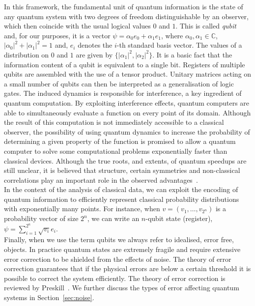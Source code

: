 \documentclass[a4paper, 11pt]{article}
\begin{document}
In this framework, the fundamental unit of quantum information is the state of any quantum system with two degrees of freedom distinguishable by an observer, which then coincide with the usual logical values $0$ and $1$. This is called \emph{qubit} and, for our purposes, it is a vector $\psi = \alpha_0 e_0 + \alpha_1 e_1$, where $\alpha_0, \alpha_1 \in \mathbb{C}$, $|\alpha_0|^2 + |\alpha_1|^2 = 1$ and, $e_i$ denotes the $i$-th standard basis vector. The values of a distribution on $0$ and $1$ are given by $\{|\alpha_1|^2,|\alpha_2|^2\}$. It is a basic fact that the information content of a qubit is equivalent to a single bit. Registers of multiple qubits are assembled with the use of a tensor product. Unitary matrices acting on a small number of qubits can then be interpreted as a generalisation of logic gates. The induced dynamics is responsible for interference, a key ingredient of quantum computation. By exploiting interference effects, quantum computers are able to simultaneously evaluate a function on every point of its domain. Although the result of this computation is not immediately accessible to a classical observer, the possibility of using quantum dynamics to increase the probability of determining a given property of the function is promised to allow a quantum computer to solve some computational problems exponentially faster than classical devices. Although the true roots, and extents, of quantum speedups are still unclear, it is believed that structure, certain symmetries and non-classical correlations play an important role in the observed advantages~\cite{jozsa2003role, aaronson2009need}. \\

In the context of the analysis of classical data, we can exploit the encoding of quantum information to efficiently represent classical probability distributions with exponentially many points. For instance, when $v = (v_1, \dots, v_{2^n})$ is a probability vector of size $2^n$, we can write an $n$-qubit state (register), $ \psi = \sum_{i=1} ^{2^n} \sqrt{v_i} e_i $.\\

Finally, when we use the term qubits we always refer to idealised, error free, objects. In practice quantum states are extremely fragile and require extensive error correction to be shielded from the effects of noise. The theory of error correction guarantees that if the physical errors are below a certain threshold it is possible to correct the system efficiently. The theory of error correction is reviewed by Preskill~\cite{preskill1998fault}. We further discuss the types of error affecting quantum systems in Section~\ref{sec:noise}.
\end{document}

